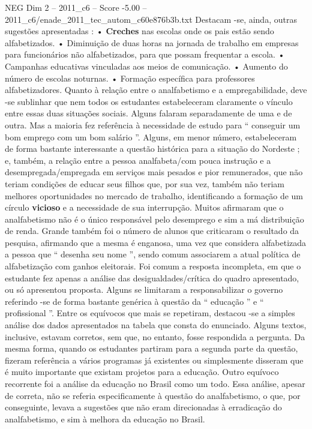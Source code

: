 \begin{textsample}{NEG Dim 2 – 2011\_c6 – Score -5.00 – 2011\_c6/enade\_2011\_tec\_autom\_c60e876b3b.txt}
Destacam -se, ainda, outras sugestões apresentadas : • \textbf{Creches} nas escolas onde os pais estão sendo alfabetizados. • Diminuição de duas horas na jornada de trabalho em empresas para funcionários não alfabetizados, para que possam frequentar a escola. • Campanhas educativas vinculadas aos meios de comunicação. • Aumento do número de escolas noturnas. • Formação específica para professores alfabetizadores.
Quanto à relação entre o analfabetismo e a empregabilidade, deve -se sublinhar que nem todos os estudantes estabeleceram claramente o vínculo entre essas duas situações sociais.
Alguns falaram separadamente de uma e de outra.
Mas a maioria fez referência à necessidade de estudo para “ conseguir um bom emprego com um bom salário ”.
Alguns, em menor número, estabeleceram de forma bastante interessante a questão histórica para a situação do Nordeste ; e, também, a relação entre a pessoa analfabeta/com pouca instrução e a desempregada/empregada em serviços mais pesados e pior remunerados, que não teriam condições de educar seus filhos que, por sua vez, também não teriam melhores oportunidades no mercado de trabalho, identificando a formação de um círculo \textbf{vicioso} e a necessidade de sua interrupção.
Muitos afirmaram que o analfabetismo não é o único responsável pelo desemprego e sim a má distribuição de renda.
Grande também foi o número de alunos que criticaram o resultado da pesquisa, afirmando que a mesma é enganosa, uma vez que considera alfabetizada a pessoa que “ desenha seu nome ”, sendo comum associarem a atual política de alfabetização com ganhos eleitorais.
Foi comum a resposta incompleta, em que o estudante fez apenas a análise das desigualdades/crítica do quadro apresentado, ou só apresentou proposta.
Alguns se limitaram a responsabilizar o governo referindo -se de forma bastante genérica à questão da “ educação ” e “ profissional ”.
Entre os equívocos que mais se repetiram, destacou -se a simples análise dos dados apresentados na tabela que consta do enunciado.
Alguns textos, inclusive, estavam corretos, sem que, no entanto, fosse respondida a pergunta.
Da mesma forma, quando os estudantes partiram para a segunda parte da questão, fizeram referência a vários programas já existentes ou simplesmente disseram que é muito importante que existam projetos para a educação.
Outro equívoco recorrente foi a análise da educação no Brasil como um todo.
Essa análise, apesar de correta, não se referia especificamente à questão do analfabetismo, o que, por conseguinte, levava a sugestões que não eram direcionadas à erradicação do analfabetismo, e sim à melhora da educação no Brasil.

\end{textsample}
